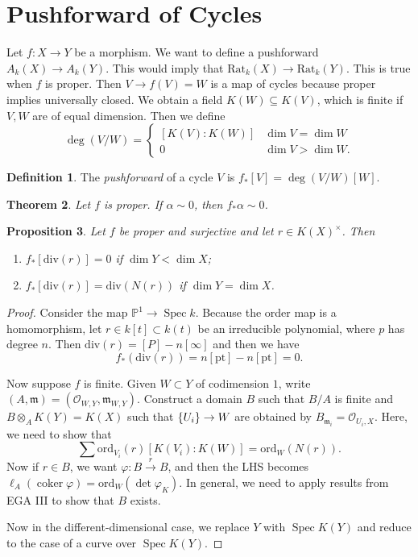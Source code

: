 \documentclass[leqno, openany]{memoir}
\newtheorem{thm}{Theorem}[section]
\newtheorem{prop}[thm]{Proposition}
\theoremstyle{definition}
\newtheorem{defn}[thm]{Definition}
\theoremstyle{remark}
\theoremstyle{plain}
\theoremstyle{definition}
\theoremstyle{remark}
\renewcommand{\P}{\mathbb{P}}
\newcommand{\mc}[1]{\mathcal{#1}}
\newcommand{\mf}[1]{\mathfrak{#1}}
\newcommand{\mr}[1]{\mathrm{#1}}
\DeclareMathOperator{\Spec}{Spec}
\begin{document}
\section{Pushforward of Cycles}%

Let $f \colon X \to Y$ be a morphism. We want to define a pushforward $A_k(X)
\to A_k(Y)$. This would imply that $\mr{Rat}_k(X) \to \mr{Rat}_k(Y)$. This is
true when $f$ is proper. Then $V \to f(V) = W$ is a map of cycles because
proper implies universally closed. We obtain a field $K(W) \subseteq K(V)$,
which is finite if $V,W$ are of equal dimension. Then we define \[ \deg(V/W) =
    \begin{cases} [K(V) : K(W)] & \dim V = \dim W \\ 0 & \dim V > \dim W.
    \end{cases} \]

\begin{defn} The \textit{pushforward}  of a cycle $V$ is $f_* [V] = \deg(V/W)
[W]$.  \end{defn}

\begin{thm} Let $f$ is proper. If $\alpha \sim 0$, then $f_* \alpha \sim 0$.
\end{thm}

\begin{prop} Let $f$ be proper and surjective and let $r \in {K(X)}^{\times}$.
Then \begin{enumerate} \item $f_* [ \mr{div}(r) ] = 0$ if $\dim Y < \dim X$;
\item $f_* [\mr{div}(r)] = \mr{div}(N(r))$ if $\dim Y = \dim X$.
\end{enumerate} \end{prop}

\begin{proof} Consider the map $\P^1 \to \Spec k$. Because the order map is a
    homomorphism, let $r \in k[t] \subset k(t)$ be an irreducible polynomial,
    where $p$ has degree $n$. Then $\mr{div}(r) = [P] - n [\infty]$ and then we
    have \[ f_* (\mr{div}(r)) = n[\mr{pt}] - n [\mr{pt}] = 0. \]

    Now suppose $f$ is finite. Given $W \subset Y$ of codimension $1$, write
    $(A, \mf{m}) = (\mc{O}_{W,Y}, \mf{m}_{W,Y})$. Construct a domain $B$ such
    that $B/A$ is finite and $B \otimes_A K(Y) = K(X)$ such that $\qty{U_i} \to
    W$ are obtained by $B_{\mf{m}_i} = \mc{O}_{U_i, X}$. Here, we need to show
    that \[ \sum \mr{ord}_{V_i}(r) [K(V_i) \colon K(W)] = \mr{ord}_W(N(r)). \]
    Now if $r \in B$, we want $\varphi \colon B \xrightarrow{r} B$, and then
    the LHS becomes $\ell_A(\operatorname{coker} \varphi) = \mr{ord}_W(\det
    \varphi_K)$. In general, we need to apply results from EGA III to show that
    $B$ exists.

    Now in the different-dimensional case, we replace $Y$ with $\Spec K(Y)$ and
reduce to the case of a curve over $\Spec K(Y)$.  \end{proof}
\end{document}
